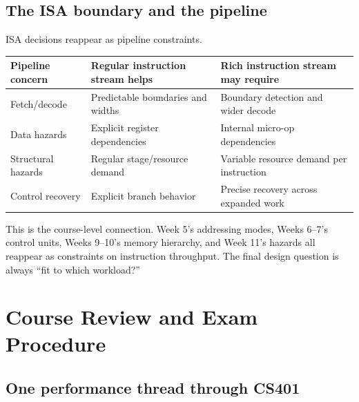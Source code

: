 \documentclass[11pt]{article}
\begin{document}
\subsection{The ISA boundary and the pipeline}

ISA decisions reappear as pipeline constraints.
\begin{center}
\small
\begin{tabular}{@{}>{\raggedright\arraybackslash}p{3.1cm}>{\raggedright\arraybackslash}p{4.2cm}>{\raggedright\arraybackslash}p{4.2cm}@{}}
\toprule
\textbf{Pipeline concern} & \textbf{Regular instruction stream helps} & \textbf{Rich instruction stream may require}\\
\midrule
Fetch/decode & Predictable boundaries and widths & Boundary detection and wider decode\\
Data hazards & Explicit register dependencies & Internal micro-op dependencies\\
Structural hazards & Regular stage/resource demand & Variable resource demand per instruction\\
Control recovery & Explicit branch behavior & Precise recovery across expanded work\\
\bottomrule
\end{tabular}
\end{center}

This is the course-level connection. Week 5's addressing modes, Weeks 6--7's
control units, Weeks 9--10's memory hierarchy, and Week 11's hazards all
reappear as constraints on instruction throughput. The final design question
is always ``fit to which workload?''

\section{Course Review and Exam Procedure}
\label{sec:review}

\subsection{One performance thread through CS401}
\end{document}
